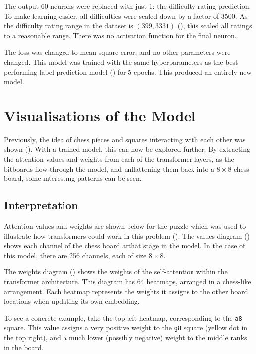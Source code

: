 The output 60 neurons were replaced with just 1: the difficulty rating
prediction. To make learning easier, all difficulties were scaled down by a
factor of 3500. As the difficulty rating range in the dataset is $(399, 3331)$
(), this scaled all ratings to a reasonable range. There
was no activation function for the final neuron.

The loss was changed to mean square error, and no other parameters were
changed. This model was trained with the same hyperparameters as the best
performing label prediction model () for 5 epochs. This produced an
entirely new model.

\section{Visualisations of the Model}\label{mlS3}

Previously, the idea of chess pieces and squares interacting with each other
was shown (). With a trained model, this can now be
explored further. By extracting the attention values and weights from each of
the transformer layers, as the bitboards flow through the model, and unflattening
them back into a $8\times8$ chess board, some interesting patterns can be seen.

\subsection{Interpretation}

Attention values and weights are shown below for the puzzle which was used to
illustrate how transformers could work in this problem
(). The values diagram () shows each channel
of the chess board atthat stage in the model. In the case of this model, there
are 256 channels, each of size $8\times8$. 

The weights diagram () shows the weights of the self-attention
within the transformer architecture. This diagram has 64 heatmaps, arranged in
a chess-like arrangement. Each heatmap represents the weights it assigns to the
other board locations when updating its own embedding. 

To see a concrete example, take the top left heatmap, corresponding to the
\texttt{a8} square. This value assigns a very positive weight to the
\texttt{g8} square (yellow dot in the top right), and a much lower (possibly
negative) weight to the middle ranks in the board.


